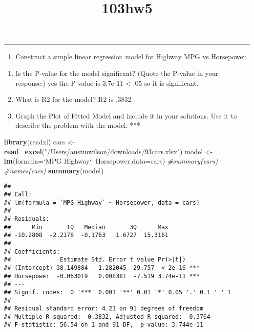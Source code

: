 \documentclass[]{article}
\title{103hw5}
\author{}
\date{\vspace{-2.5em}}
\newenvironment{Shaded}{\begin{snugshade}}{\end{snugshade}}
\newcommand{\CommentTok}[1]{\textcolor[rgb]{0.56,0.35,0.01}{\textit{#1}}}
\newcommand{\DataTypeTok}[1]{\textcolor[rgb]{0.13,0.29,0.53}{#1}}
\newcommand{\KeywordTok}[1]{\textcolor[rgb]{0.13,0.29,0.53}{\textbf{#1}}}
\newcommand{\NormalTok}[1]{#1}
\newcommand{\OperatorTok}[1]{\textcolor[rgb]{0.81,0.36,0.00}{\textbf{#1}}}
\newcommand{\StringTok}[1]{\textcolor[rgb]{0.31,0.60,0.02}{#1}}
\providecommand{\tightlist}{%
  \setlength{\itemsep}{0pt}\setlength{\parskip}{0pt}}
\begin{document}
\maketitle

\begin{center}\rule{0.5\linewidth}{0.5pt}\end{center}

\begin{enumerate}
\def\labelenumi{\arabic{enumi}.}
\tightlist
\item
  Construct a simple linear regression model for Highway MPG vs
  Horsepower.
\end{enumerate}

\begin{enumerate}
\def\labelenumi{\alph{enumi}.}
\tightlist
\item
  Is the P-value for the model significant? (Quote the P-value in your
  response.) yes the P-value is 3.7e-11 \textless{} .05 so it is
  significant.
\item
  What is R2 for the model? R2 is .3832
\item
  Graph the Plot of Fitted Model and include it in your solutions. Use
  it to describe the problem with the model. ***
\end{enumerate}

\begin{Shaded}
\begin{Highlighting}[]
\KeywordTok{library}\NormalTok{(readxl)}
\NormalTok{cars <-}\StringTok{ }\KeywordTok{read_excel}\NormalTok{(}\StringTok{"/Users/austinwilson/downloads/93cars.xlsx"}\NormalTok{)}
\NormalTok{model <-}\StringTok{ }\KeywordTok{lm}\NormalTok{(}\DataTypeTok{formula=}\StringTok{`}\DataTypeTok{MPG Highway}\StringTok{`}\OperatorTok{~}\NormalTok{Horsepower,}\DataTypeTok{data=}\NormalTok{cars)}
\CommentTok{#summary(cars)}
\CommentTok{#names(cars)}
\KeywordTok{summary}\NormalTok{(model)}
\end{Highlighting}
\end{Shaded}

\begin{verbatim}
## 
## Call:
## lm(formula = `MPG Highway` ~ Horsepower, data = cars)
## 
## Residuals:
##      Min       1Q   Median       3Q      Max 
## -10.2808  -2.2178  -0.1763   1.6727  15.3161 
## 
## Coefficients:
##              Estimate Std. Error t value Pr(>|t|)    
## (Intercept) 38.149884   1.282045  29.757  < 2e-16 ***
## Horsepower  -0.063019   0.008381  -7.519 3.74e-11 ***
## ---
## Signif. codes:  0 '***' 0.001 '**' 0.01 '*' 0.05 '.' 0.1 ' ' 1
## 
## Residual standard error: 4.21 on 91 degrees of freedom
## Multiple R-squared:  0.3832, Adjusted R-squared:  0.3764 
## F-statistic: 56.54 on 1 and 91 DF,  p-value: 3.744e-11
\end{verbatim}
\end{document}
